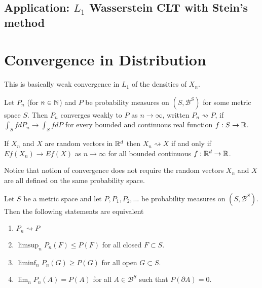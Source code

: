 \subsection{Application: $L_1$ Wasserstein CLT with  Stein's method}



\clearpage
%
%
\section{Convergence in Distribution}
This is basically weak convergence in $L_1$ of the densities of $X_n$.






\begin{definition}
Let $P_n$ (for $n\in \Bbb N$) and $P$ be probability measures on $(S,\mathcal B^S)$ for some metric space $S$. Then $P_n$ converges weakly to $P$ as $n\rightarrow \infty$, written $P_n\rightsquigarrow P$, if $\int_S f dP_n\rightarrow  \int_S f dP$  for every bounded and continuous real function $f:S\rightarrow \Bbb R$.
\end{definition}



\begin{definition}
If $X_n$ and $X$ are random vectors in $\Bbb R^d$  then $X_n\rightsquigarrow X$ if and only if $Ef(X_n) \rightarrow Ef(X)$ as $n\rightarrow \infty$ for all bounded continuous $f:\Bbb R^d\rightarrow \Bbb R$.
\end{definition}




Notice that notion of convergence does not require the random vectors $X_n$ and $X$ are all defined on the same probability space.




\begin{theorem}[{\bf Portmanteau I}]
Let $S$ be a metric space and let $P, P_1, P_2, \ldots$ be probability measures on $(S, \mathcal B^S)$. Then the following statements are equivalent
\begin{enumerate}
\item $P_n\rightsquigarrow P$
\item $\limsup_{n} P_n(F) \leq P(F)$ for all closed $F\subset S$.
\item $\liminf_{n} P_n(G) \geq P(G)$ for all open $G\subset S$.
\item $\lim_n P_n(A)= P(A)$ for all $A\in \mathcal B^S$ such that $P(\partial A) = 0$.
\end{enumerate}
\end{theorem}


